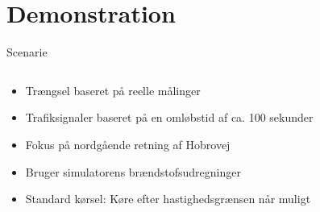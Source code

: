 \section{Demonstration}
\begin{frame}{Scenarie}
\begin{columns}
\begin{column}{0.6\textwidth}
\begin{itemize}
\item Trængsel baseret på reelle målinger
\item Trafiksignaler baseret på en omløbstid af ca. 100 sekunder
\item Fokus på nordgående retning af Hobrovej
\item Bruger simulatorens brændstofsudregninger
\item Standard kørsel: Køre efter hastighedsgrænsen når muligt
\end{itemize}
\end{column}


\end{columns}
\end{frame}
